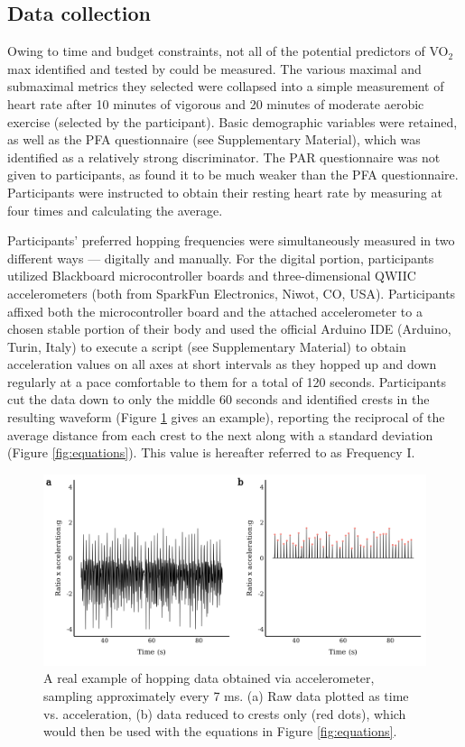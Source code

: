 \documentclass{article}
\begin{document}
\subsection{Data collection}
Owing to time and budget constraints, not all of the potential predictors of VO$_2$max identified and tested by \textcite{abut2016} could be measured. The various maximal and submaximal metrics they selected were collapsed into a simple measurement of heart rate after 10 minutes of vigorous and 20 minutes of moderate aerobic exercise (selected by the participant). Basic demographic variables were retained, as well as the PFA questionnaire (see Supplementary Material), which was identified as a relatively strong discriminator. The PAR questionnaire was not given to participants, as \textcite{abut2016} found it to be much weaker than the PFA questionnaire. Participants were instructed to obtain their resting heart rate by measuring at four times and calculating the average.

Participants' preferred hopping frequencies were simultaneously measured in two different ways — digitally and manually. For the digital portion, participants utilized Blackboard microcontroller boards and three-dimensional QWIIC accelerometers (both from SparkFun Electronics, Niwot, CO, USA). Participants affixed both the microcontroller board and the attached accelerometer to a chosen stable portion of their body and used the official Arduino IDE (Arduino, Turin, Italy) to execute a script (see Supplementary Material) to obtain acceleration values on all axes at short intervals as they hopped up and down regularly at a pace comfortable to them for a total of 120 seconds. Participants cut the data down to only the middle 60 seconds and identified crests in the resulting waveform (Figure \ref{fig:examplehop} gives an example), reporting the reciprocal of the average distance from each crest to the next along with a standard deviation (Figure \ref{fig:equations}). This value is hereafter referred to as Frequency I. 

\begin{figure}[h!]
\centering
\includegraphics[width=\linewidth]{plots/examplehop.png}
\caption{\centering A real example of hopping data obtained via accelerometer, sampling approximately every 7 ms. (a) Raw data plotted as time vs. acceleration, (b) data reduced to crests only (red dots), which would then be used with the equations in Figure \ref{fig:equations}.}
\label{fig:examplehop}
\end{figure}
\end{document}
